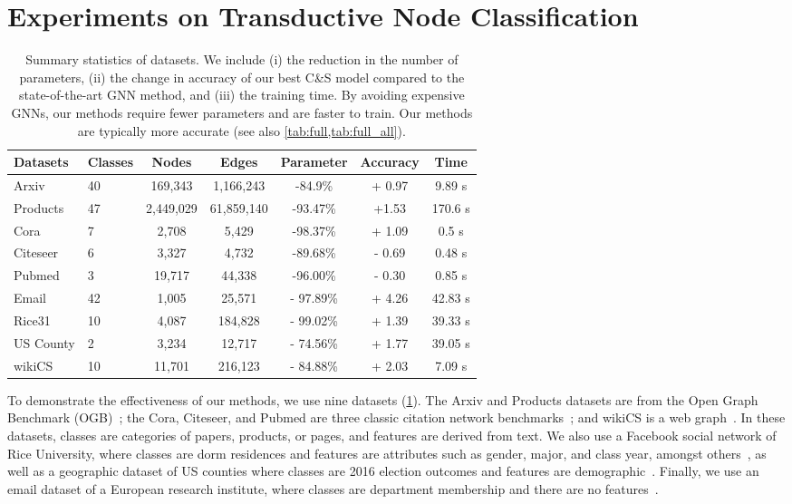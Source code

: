 \documentclass{article}
\newcommand{\framework}{C\&S}
\begin{document}
\section{Experiments on Transductive Node Classification}\label{sec:full}
\begin{table}[t]
\caption{Summary statistics of datasets.
We include (i) the reduction in the number of parameters, 
(ii) the change in accuracy of our best \framework{} model compared to the state-of-the-art GNN method, and
(iii) the training time.
By avoiding expensive GNNs, our methods require fewer parameters and are faster to train.
Our methods are typically more accurate (see also \cref{tab:full,tab:full_all}).
}
\vspace{-\baselineskip}
\label{tab:stats}
\begin{center}
\begin{tabular}{ll ccccc}
\toprule
Datasets  & Classes & Nodes & Edges & Parameter  & Accuracy  &  Time \\
\midrule
Arxiv    & 40 & 169,343 & 1,166,243 & -84.9\% & + 0.97 & 9.89 s\\
Products   & 47 & 2,449,029 &	61,859,140 & -93.47\% & +1.53 & 170.6 s\\
Cora   & 7 & 2,708	& 5,429	& -98.37\% & + 1.09 & 0.5 s\\
Citeseer    & 6 & 3,327	& 4,732	& -89.68\% & - 0.69 & 0.48 s\\
Pubmed    & 3 & 19,717	& 44,338 & -96.00\% & - 0.30 & 0.85 s \\
Email   & 42 & 1,005 & 25,571 & - 97.89\% & + 4.26 & 42.83 s\\
Rice31   &  10 & 4,087 & 184,828& - 99.02\% & + 1.39 & 39.33 s \\
US County    & 2 & 3,234 & 12,717 & - 74.56\% & + 1.77 & 39.05 s\\
wikiCS   &  10 & 11,701 & 216,123 & - 84.88\% & + 2.03 & 7.09 s\\
\bottomrule
\end{tabular}
\end{center}
\end{table}


To demonstrate the effectiveness of our methods, we use nine datasets (\cref{tab:stats}).
The Arxiv and Products datasets are from the Open Graph Benchmark (OGB)~\citep{Hu2020OpenGB};
the Cora, Citeseer, and Pubmed are three classic citation network benchmarks~\citep{getoor2001learning,getoor2005link,namata2012query}; and
wikiCS is a web graph~\citep{Mernyei2020WikiCSAW}.
In these datasets, classes are categories of papers, products, or pages, and features are derived from text.
We also use a Facebook social network of Rice University, where classes are dorm residences
and features are attributes such as gender, major, and class year, amongst others~\citep{Traud2011SocialSO},
as well as a geographic dataset of US counties where classes are 2016 election outcomes
and features are demographic~\citep{Jia-2020-GNNR}.
Finally, we use an email dataset of a European research institute, where classes are department membership
and there are no features~\citep{leskovec2007graph,yin2017local}.
\end{document}
